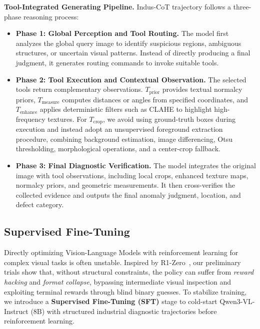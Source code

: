 \documentclass{llmxive}
\begin{document}
\textbf{Tool-Integrated Generating Pipeline.}
Indus-CoT trajectory follows a three-phase reasoning process:
\begin{itemize}[leftmargin=*,nosep]
    \item \textbf{Phase 1: Global Perception and Tool Routing.} 
    The model first analyzes the global query image to identify suspicious regions, ambiguous structures, or uncertain visual patterns. 
    Instead of directly producing a final judgment, it generates routing commands to invoke suitable tools.

    \item \textbf{Phase 2: Tool Execution and Contextual Observation.} 
    The selected tools return complementary observations. 
    $T_{\text{prior}}$ provides textual normalcy priors, $T_{\text{measure}}$ computes distances or angles from specified coordinates, and $T_{\text{enhance}}$ applies deterministic filters such as CLAHE to highlight high-frequency textures. 
    For $T_{\text{crop}}$, we avoid using ground-truth boxes during execution and instead adopt an unsupervised foreground extraction procedure, combining background estimation, image differencing, Otsu thresholding, morphological operations, and a center-crop fallback.

    \item \textbf{Phase 3: Final Diagnostic Verification.} 
    The model integrates the original image with tool observations, including local crops, enhanced texture maps, normalcy priors, and geometric measurements. 
    It then cross-verifies the collected evidence and outputs the final anomaly judgment, location, and defect category.
\end{itemize}

\subsection{Supervised Fine-Tuning}
\label{sec:SFT}

Directly optimizing Vision-Language Models with reinforcement learning for complex visual tasks is often unstable. Inspired by R1-Zero~\citep{guo2025deepseek}, our preliminary trials show that, without structural constraints, the policy can suffer from \emph{reward hacking} and \emph{format collapse}, bypassing intermediate visual inspection and exploiting terminal rewards through blind binary guesses. To stabilize training, we introduce a \textbf{Supervised Fine-Tuning (SFT)} stage to cold-start Qwen3-VL-Instruct (8B) with structured industrial diagnostic trajectories before reinforcement learning.
\end{document}
